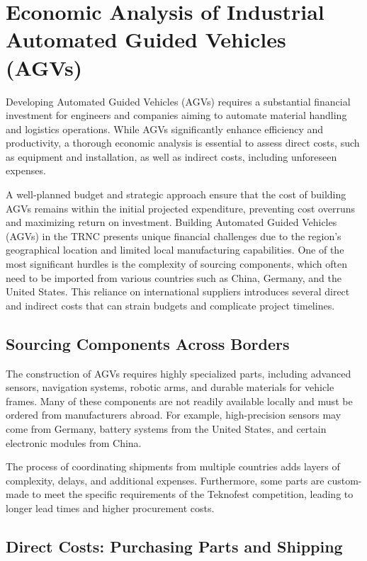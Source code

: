 \documentclass[../../main]{subfiles}
\begin{document}
\section{Economic Analysis of Industrial Automated Guided Vehicles (AGVs)}

Developing Automated Guided Vehicles (AGVs) requires a substantial financial investment for engineers and companies aiming to automate material handling and logistics operations. While AGVs significantly enhance efficiency and productivity, a thorough economic analysis is essential to assess direct costs, such as equipment and installation, as well as indirect costs, including unforeseen expenses.

A well-planned budget and strategic approach ensure that the cost of building AGVs remains within the initial projected expenditure, preventing cost overruns and maximizing return on investment.
Building Automated Guided Vehicles (AGVs) in the TRNC presents unique financial challenges due to the region's geographical location and limited local manufacturing capabilities. One of the most significant hurdles is the complexity of sourcing components, which often need to be imported from various countries such as China, Germany, and the United States. This reliance on international suppliers introduces several direct and indirect costs that can strain budgets and complicate project timelines.

\subsection{Sourcing Components Across Borders}

The construction of AGVs requires highly specialized parts, 
including advanced sensors, navigation systems, robotic arms, 
and durable materials for vehicle frames. Many of these components
are not readily available locally and must be ordered from manufacturers abroad.
For example, high-precision sensors may come from Germany, battery systems from the
United States, and certain electronic modules from China. 

The process of coordinating shipments from multiple countries adds 
layers of complexity, delays, and additional expenses. Furthermore, 
some parts are custom-made to meet the specific requirements of the Teknofest competition, 
leading to longer lead times and higher procurement costs.

\subsection{Direct Costs: Purchasing Parts and Shipping}
\end{document}
